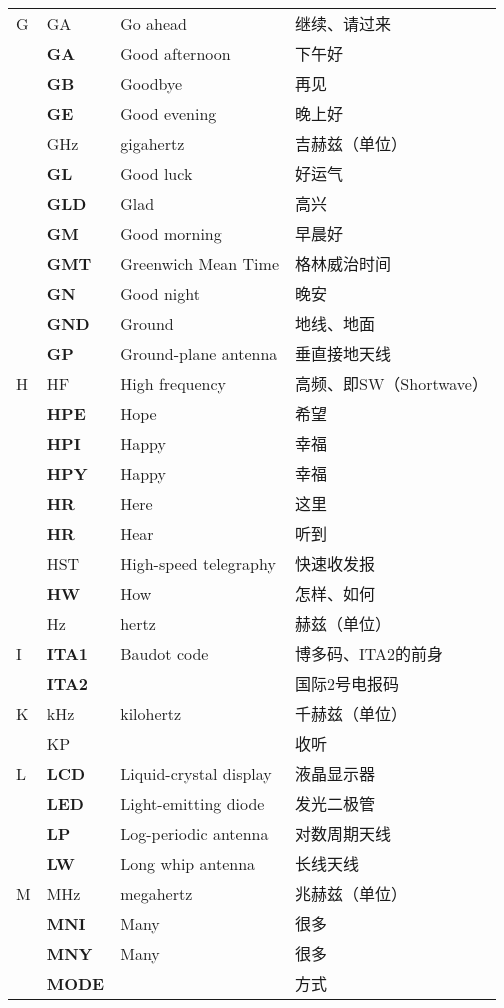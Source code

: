 \begin{longtable}[l]{llll}
G & GA & Go ahead & 继续、请过来 \\
& \textbf{GA} & Good afternoon & 下午好 \\
& \textbf{GB} & Goodbye & 再见 \\
& \textbf{GE} & Good evening & 晚上好 \\
& GHz & gigahertz & 吉赫兹（单位） \\
& \textbf{GL} & Good luck & 好运气 \\
& \textbf{GLD} & Glad & 高兴 \\
& \textbf{GM} & Good morning & 早晨好 \\
& \textbf{GMT} & Greenwich Mean Time & 格林威治时间 \\ %
& \textbf{GN} & Good night & 晚安 \\
& \textbf{GND} & Ground & 地线、地面 \\
& \textbf{GP} & Ground-plane antenna & 垂直接地天线 \\
H & HF & High frequency & 高频、即SW（Shortwave） \\
& \textbf{HPE} & Hope & 希望 \\
& \textbf{HPI} & Happy & 幸福 \\
& \textbf{HPY} & Happy & 幸福 \\
& \textbf{HR} & Here & 这里 \\
& \textbf{HR} & Hear & 听到 \\
& HST & High-speed telegraphy & 快速收发报 \\
& \textbf{HW} & How & 怎样、如何 \\
& Hz & hertz & 赫兹（单位） \\
I & \textbf{ITA1} & Baudot code & 博多码、ITA2的前身 \\
& \textbf{ITA2} & & 国际2号电报码 \\
K & kHz & kilohertz & 千赫兹（单位） \\
& KP & & 收听 \\
L & \textbf{LCD} & Liquid-crystal display & 液晶显示器 \\
& \textbf{LED} & Light-emitting diode & 发光二极管 \\
& \textbf{LP} & Log-periodic antenna & 对数周期天线 \\
& \textbf{LW} & Long whip antenna & 长线天线 \\
M & MHz & megahertz & 兆赫兹（单位） \\
& \textbf{MNI} & Many & 很多 \\
& \textbf{MNY} & Many & 很多 \\
& \textbf{MODE} & & 方式 \\

\end{longtable}
